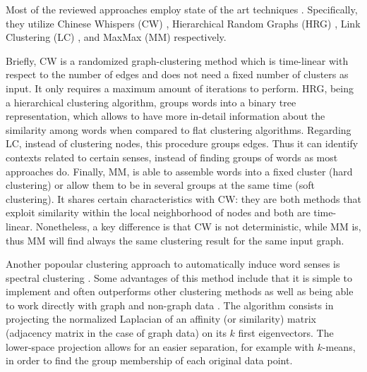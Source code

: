 Most of the reviewed approaches employ state of the art techniques \cite{2008.Klapaftis.WSIUsingCollocations,2010.Klapaftis.WSD.WSD.HierarchicalGraphs,2011.Jurgens.WSICommunityDetection,2013.Hope.GradedWSI}. Specifically, they utilize Chinese Whispers (CW) \cite{biemann2006chinese}, Hierarchical Random Graphs (HRG) \cite{clauset2008hierarchical}, Link Clustering (LC) \cite{ahn2010link}, and MaxMax (MM) \cite{hope2013maxmax} respectively. 

Briefly, CW is a randomized graph-clustering method  which is time-linear with respect to the number of edges and does not need a fixed number of clusters as input. It only requires a maximum amount of iterations to perform. HRG, being a hierarchical clustering algorithm, groups words into a binary tree representation, which allows to have more in-detail information about the similarity among words when compared to flat clustering algorithms. Regarding LC, instead of clustering nodes, this procedure groups edges. Thus it can identify contexts related to certain senses, instead of finding groups of words as most approaches do. Finally, MM, is able to assemble words into a fixed cluster (hard clustering) or allow them to be in several groups at the same time (soft clustering). It shares certain characteristics with CW:  they are both methods that exploit similarity within the local neighborhood of nodes and both are time-linear. Nonetheless, a key difference is that CW is not deterministic, while MM is, thus MM will find always the same clustering result for the same input graph.

Another popoular clustering approach to automatically induce word senses is spectral clustering \cite{Shi2000}. Some advantages of this method include that it is simple to implement and often outperforms other clustering methods as well as being able to work directly with graph and non-graph data \cite{Luxburg2007}.
%
The algorithm consists in projecting the normalized Laplacian of an affinity (or similarity) matrix (adjacency matrix in the case of graph data) on its $k$ first eigenvectors. The lower-space projection allows for an easier separation, for example with $k$-means, in order to find the  group membership of each original data point. 

%

